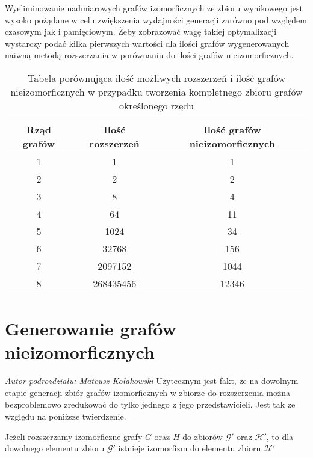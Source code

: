  Wyeliminowanie nadmiarowych grafów izomorficznych ze zbioru wynikowego jest wysoko pożądane w celu zwiększenia wydajności generacji zarówno pod względem czasowym jak i pamięciowym. Żeby zobrazować wagę takiej optymalizacji wystarczy podać kilka pierwszych wartości dla ilości grafów wygenerowanych naiwną metodą rozszerzania w porównaniu do ilości grafów nieizomorficznych.
 \begin{table}[H]
 \begin{center}
 \begin{tabular}{|c c c|} 
 \hline
 Rząd grafów & Ilość rozszerzeń\cite{OEIS2} & Ilość grafów nieizomorficznych\cite{OEIS}  \\ 
 \hline\hline
 1 & 1 & 1  \\ 
 \hline
 2 & 2 & 2  \\
 \hline
 3 & 8 & 4  \\
 \hline
 4 & 64 & 11  \\
 \hline
 5 & 1024 & 34  \\
 \hline
 6 & 32768 & 156  \\
 \hline
 7 & 2097152 & 1044  \\
 \hline
 8 & 268435456 & 12346  \\
 \hline
\end{tabular}
\end{center}
 \caption{Tabela porównująca ilość możliwych rozszerzeń i ilość grafów nieizomorficznych w przypadku tworzenia kompletnego zbioru grafów określonego rzędu}
 \end{table}

\section{Generowanie grafów nieizomorficznych}
\textit{Autor podrozdziału: Mateusz Kołakowski}
\vspace{0.5cm}\newline
Użytecznym jest fakt, że na dowolnym etapie generacji zbiór grafów izomorficznych w zbiorze do rozszerzenia można bezproblemowo zredukować do tylko jednego z jego przedstawicieli. Jest tak ze względu na poniższe twierdzenie.
\begin{theorem}
Jeżeli rozszerzamy izomorficzne grafy $G$ oraz $H$ do zbiorów $\mathcal{G'}$ oraz $\mathcal{H'}$, to dla dowolnego elementu zbioru $\mathcal{G'}$ istnieje izomorfizm do elementu zbioru $\mathcal{H'}$
\end{theorem}


